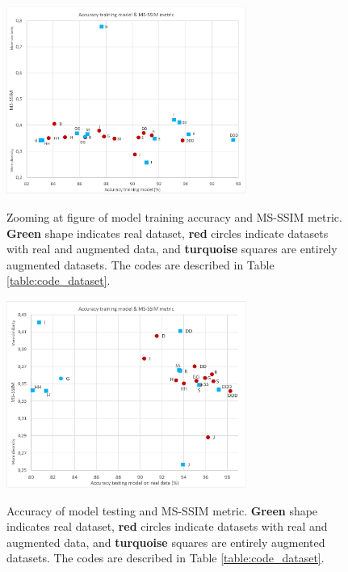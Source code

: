 \documentclass[journal]{IEEEtran}
\begin{document}
\begin{figure}
\centering
{\includegraphics[width=0.7\textwidth,keepaspectratio]{img/entrenamiento_msssim_zoom.png}}
\caption{Zooming at figure of model training accuracy and MS-SSIM metric. \textcolor{dotgreen}{\textbf{Green}} shape indicates real dataset, \textcolor{dotred}{\textbf{red}} circles indicate datasets with real and augmented data, and \textcolor{dotsky}{\textbf{turquoise}} squares are entirely augmented datasets. The codes are described in Table \ref{table:code_dataset}.}
\label{fig:da_training_msssim_zoom}
\end{figure}

\begin{figure}
\centering
{\includegraphics[width=0.7\textwidth,keepaspectratio]{img/prueba_msssim.png}}
\caption{Accuracy of model testing and MS-SSIM metric. \textcolor{dotgreen}{\textbf{Green}} shape indicates real dataset, \textcolor{dotred}{\textbf{red}} circles indicate datasets with real and augmented data, and \textcolor{dotsky}{\textbf{turquoise}} squares are entirely augmented datasets. The codes are described in Table \ref{table:code_dataset}.}
\label{fig:da_test_msssim}
\end{figure}
\end{document}

